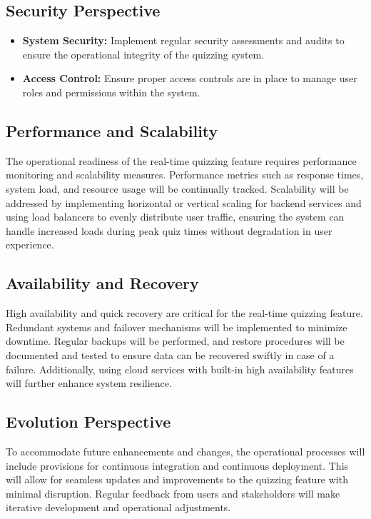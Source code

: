 \subsection{Security Perspective}

\begin{itemize}
    \item \textbf{System Security:} Implement regular security assessments and audits to ensure the operational integrity of the quizzing system.
    \item \textbf{Access Control:} Ensure proper access controls are in place to manage user roles and permissions within the system.
\end{itemize}


\subsection{Performance and Scalability}

The operational readiness of the real-time quizzing feature requires performance monitoring and scalability measures. Performance metrics such as response times, system load, and resource usage will be continually tracked. Scalability will be addressed by implementing horizontal or vertical scaling for backend services and using load balancers to evenly distribute user traffic, ensuring the system can handle increased loads during peak quiz times without degradation in user experience.


\subsection{Availability and Recovery}

High availability and quick recovery are critical for the real-time quizzing feature. Redundant systems and failover mechanisms will be implemented to minimize downtime. Regular backups will be performed, and restore procedures will be documented and tested to ensure data can be recovered swiftly in case of a failure. Additionally, using cloud services with built-in high availability features will further enhance system resilience.


\subsection{Evolution Perspective}

To accommodate future enhancements and changes, the operational processes will include provisions for continuous integration and continuous deployment. This will allow for seamless updates and improvements to the quizzing feature with minimal disruption. Regular feedback from users and stakeholders will make iterative development and operational adjustments.



